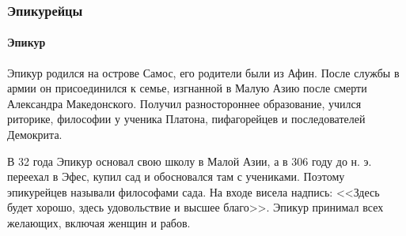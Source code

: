 \subsubsection{Эпикурейцы}

\paragraph{Эпикур}


Эпикур родился на острове Самос, его родители были из Афин. После службы в армии он присоединился к семье, изгнанной в Малую Азию после смерти Александра Македонского. Получил разностороннее образование, учился риторике, философии у ученика Платона, пифагорейцев и последователей Демокрита.


В 32 года Эпикур основал свою школу в Малой Азии, а в 306 году до н. э. переехал в Эфес, купил сад и обосновался там с учениками. Поэтому эпикурейцев называли философами сада. На входе висела надпись: <<Здесь будет хорошо, здесь удовольствие и высшее благо>>. Эпикур принимал всех желающих, включая женщин и рабов.



